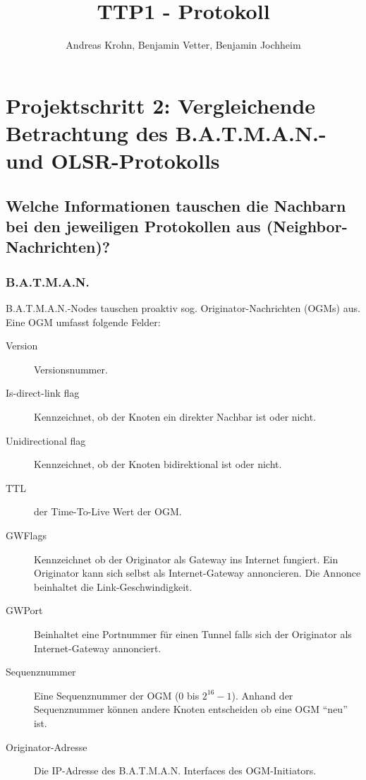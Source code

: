 \documentclass[a4paper,10pt]{article}
\title{TTP1 - Protokoll}
\author{Andreas Krohn, Benjamin Vetter, Benjamin Jochheim}
\begin{document}
\maketitle

\tableofcontents 

\newpage

\section{Projektschritt 2: Vergleichende Betrachtung des B.A.T.M.A.N.- und OLSR-Protokolls}

\subsection{Welche Informationen tauschen die Nachbarn bei den jeweiligen Protokollen aus (Neighbor-Nachrichten)?}


\subsubsection*{B.A.T.M.A.N.}

B.A.T.M.A.N.-Nodes tauschen proaktiv sog. Originator-Nachrichten (OGMs) aus.
Eine OGM umfasst folgende Felder: 

\begin{description}
  \item[Version] Versionsnummer.
  \item[Is-direct-link flag] Kennzeichnet, ob der Knoten ein direkter Nachbar ist oder nicht.
  \item[Unidirectional flag] Kennzeichnet, ob der Knoten bidirektional ist oder nicht.
  \item[TTL] der Time-To-Live Wert der OGM.
  \item[GWFlags] Kennzeichnet ob der Originator als Gateway ins Internet fungiert. Ein Originator kann sich selbst als Internet-Gateway annoncieren. Die Annonce beinhaltet die Link-Geschwindigkeit.
  \item[GWPort] Beinhaltet eine Portnummer für einen Tunnel falls sich der Originator als Internet-Gateway annonciert.
  \item[Sequenznummer] Eine Sequenznummer der OGM (0 bis $2^{16}-1$). Anhand der Sequenznummer können andere Knoten entscheiden ob eine OGM "`neu"' ist.
  \item[Originator-Adresse] Die IP-Adresse des B.A.T.M.A.N. Interfaces des OGM-Initiators.
\end{description}
\end{document}
